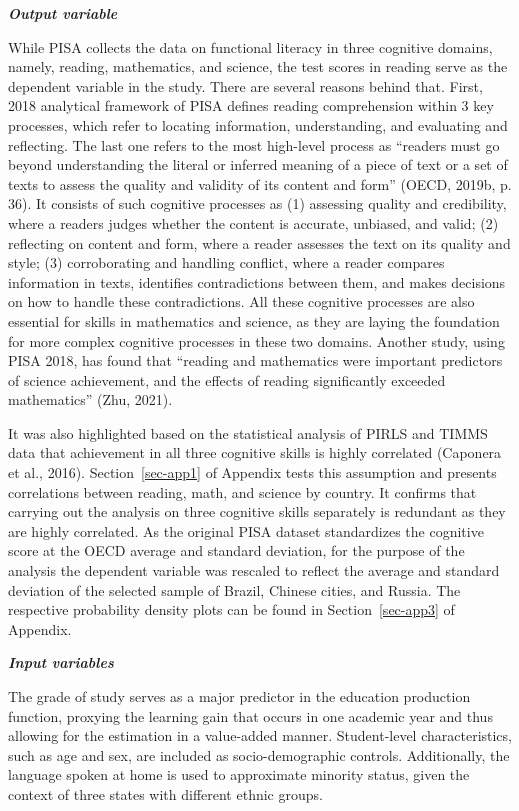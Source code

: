\documentclass[
]{article}
\begin{document}
\textbf{\emph{Output variable}}

While PISA collects the data on functional literacy in three cognitive
domains, namely, reading, mathematics, and science, the test scores in
reading serve as the dependent variable in the study. There are several
reasons behind that. First, 2018 analytical framework of PISA defines
reading comprehension within 3 key processes, which refer to locating
information, understanding, and evaluating and reflecting. The last one
refers to the most high-level process as ``readers must go beyond
understanding the literal or inferred meaning of a piece of text or a
set of texts to assess the quality and validity of its content and
form'' (OECD, 2019b, p. 36). It consists of such cognitive processes as
(1) assessing quality and credibility, where a readers judges whether
the content is accurate, unbiased, and valid; (2) reflecting on content
and form, where a reader assesses the text on its quality and style; (3)
corroborating and handling conflict, where a reader compares information
in texts, identifies contradictions between them, and makes decisions on
how to handle these contradictions. All these cognitive processes are
also essential for skills in mathematics and science, as they are laying
the foundation for more complex cognitive processes in these two
domains. Another study, using PISA 2018, has found that ``reading and
mathematics were important predictors of science achievement, and the
effects of reading significantly exceeded mathematics'' (Zhu, 2021).

It was also highlighted based on the statistical analysis of PIRLS and
TIMMS data that achievement in all three cognitive skills is highly
correlated (Caponera et al., 2016). Section~\ref{sec-app1} of Appendix
tests this assumption and presents correlations between reading, math,
and science by country. It confirms that carrying out the analysis on
three cognitive skills separately is redundant as they are highly
correlated. As the original PISA dataset standardizes the cognitive
score at the OECD average and standard deviation, for the purpose of the
analysis the dependent variable was rescaled to reflect the average and
standard deviation of the selected sample of Brazil, Chinese cities, and
Russia. The respective probability density plots can be found in
Section~\ref{sec-app3} of Appendix.

\textbf{\emph{Input variables}}

The grade of study serves as a major predictor in the education
production function, proxying the learning gain that occurs in one
academic year and thus allowing for the estimation in a value-added
manner. Student-level characteristics, such as age and sex, are included
as socio-demographic controls. Additionally, the language spoken at home
is used to approximate minority status, given the context of three
states with different ethnic groups.
\end{document}
